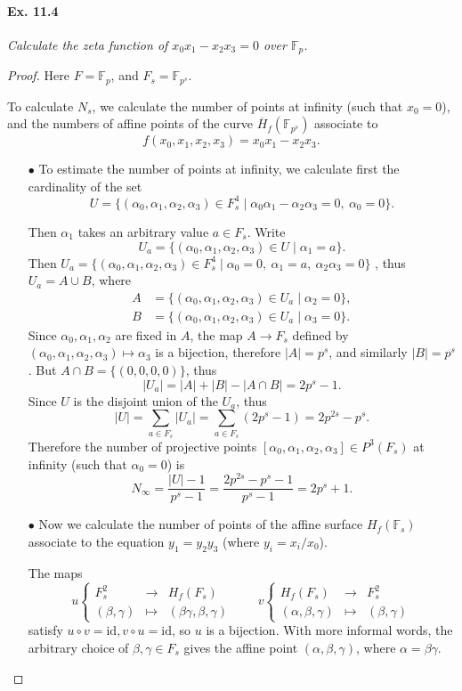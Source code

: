 \documentclass[11pt,a4paper]{article}
\newcommand{\F}{\mathbb{F}}
\begin{document}
\paragraph{Ex. 11.4}{\it Calculate the zeta function of $x_0 x_1 - x_2 x_3 = 0$ over $\F_p$.
}
\begin{proof}
Here $F = \F_p$, and $F_s = \F_{p^s}$.

To calculate $N_s$, we calculate the number of points at infinity (such that $x_0 = 0$), and the numbers of affine points of the curve $\overline{H}_f(\F_{p^s})$ associate to $$f(x_0,x_1,x_2,x_3) = x_0 x_1 - x_2 x_3.$$
\begin{enumerate}
\item[$\bullet$] To estimate the number of points at infinity, we calculate first the cardinality of the set
$$U = \{(\alpha_0,\alpha_1,\alpha_2,\alpha_3) \in F_s^4 \mid \alpha_0 \alpha_1 - \alpha_2  \alpha_3 =0,\ \alpha_0 = 0\}.$$ 

Then $\alpha_1$ takes an arbitrary value $a \in F_s$. Write
$$U_a =\{(\alpha_0,\alpha_1,\alpha_2,\alpha_3) \in U \mid  \alpha_1 = a\}.$$
Then $U_a =\{(\alpha_0,\alpha_1,\alpha_2,\alpha_3) \in  F_s^4\mid  \alpha_0 = 0,\ \alpha_1 = a,\ \alpha_2\alpha_3 = 0\}$ , thus $U_a = A \cup B$, where 
\begin{align*}
A &= \{(\alpha_0,\alpha_1,\alpha_2,\alpha_3) \in U_a \mid \alpha_2 = 0\},\\
B &= \{(\alpha_0,\alpha_1,\alpha_2,\alpha_3) \in U_a \mid \alpha_3 = 0\}.
\end{align*}
Since $\alpha_0,\alpha_1,\alpha_2$ are fixed in $A$, the map $A \to F_s$ defined by $(\alpha_0,\alpha_1,\alpha_2,\alpha_3) \mapsto \alpha_3$ is a bijection, therefore $|A| = p^s$, and similarly $|B| = p^s$. But $A\cap B = \{(0,0,0,0)\}$, thus 
$$|U_a| = |A| + |B| - |A\cap B| = 2p^s - 1.$$
Since $U$ is the disjoint union of the $U_a$, thus
$$|U| = \sum_{a\in F_s} |U_a| = \sum_{a\in F_s} (2p^s - 1) = 2p^{2s} - p^s .$$
Therefore the number of projective points $[\alpha_0,\alpha_1,\alpha_2,\alpha_3] \in P^3(F_s)$ at infinity (such that $\alpha_0 = 0$) is
$$N_\infty = \frac{|U|-1}{p^s-1} =\frac{ 2p^{2s} - p^s -1}{p^s-1} = 2p^s+1.$$

\item[$\bullet$] Now we calculate the number of points of the affine surface $H_f(\F_s)$ associate to the equation $y_1 = y_2 y_3$ (where $y_i = x_i/x_0$).

The maps 
$$
u
\left\{
\begin{array}{ccl}
F_s^2 & \to & H_f(F_s)\\
(\beta, \gamma) & \mapsto &(\beta \gamma, \beta, \gamma)
\end{array}
\right.
\qquad
v
\left\{
\begin{array}{ccl}
H_f(F_s) & \to & F_s^2\\
(\alpha,\beta, \gamma) & \mapsto & ( \beta, \gamma)
\end{array}
\right.
$$
satisfy $u \circ v = \mathrm{id}, v\circ u = \mathrm{id}$, so $u$ is a bijection. With more informal words, the arbitrary choice of $\beta, \gamma \in F_s$ gives the affine point $(\alpha,\beta,\gamma)$, where $\alpha = \beta \gamma$.


\end{enumerate}
\end{proof}
\end{document}
